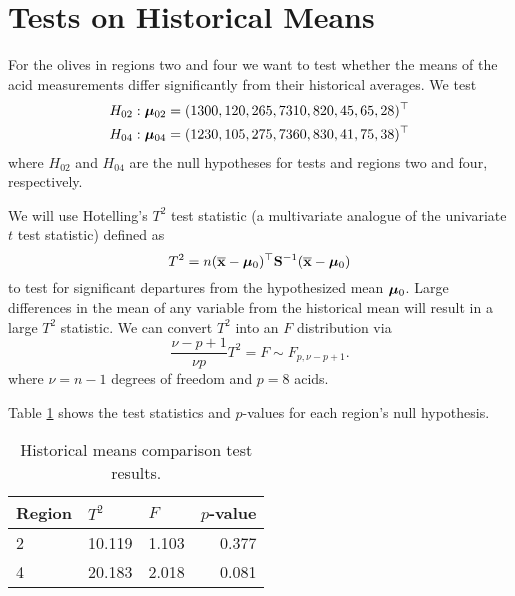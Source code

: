 \section{Tests on Historical Means}

For the olives in regions two and four we want to test whether the means of the acid measurements differ significantly from their historical averages. We test 
\begin{eqnarray*}
H_{02}:\mathbf{\bm{\mu}}_{02}=(1300,120,265,7310,820,45,65,28)^\top \\
H_{04}:\mathbf{\bm{\mu}}_{04}=(1230,105,275,7360,830,41,75,38)^\top
\end{eqnarray*}
where $H_{02}$ and $H_{04}$ are the null hypotheses for tests and regions two and four, respectively.

We will use Hotelling's $T^2$ test statistic (a multivariate analogue of the univariate $t$ test statistic) defined as
\[ T^2 = n(\overline{\mathbf{\bm{x}}}-\mathbf{\bm{\mu}}_0)^\top\mathbf{\bm{S}}^{-1}(\overline{\mathbf{\bm{x}}}-\mathbf{\bm{\mu}}_0) \]
to test for significant departures from the hypothesized mean $\mathbf{\bm{\mu}}_0$. Large differences in the mean of any variable from the historical mean will result in a large $T^2$ statistic. We can convert $T^2$ into an $F$ distribution via
\[ \frac{\nu -p+1}{\nu p}T^2 = F \sim F_{p,\nu-p+1}. \]
where $\nu=n-1$ degrees of freedom and $p=8$ acids.

Table \ref{history} shows the test statistics and $p$-values for each region's null hypothesis.
\begin{table}[H]
\begin{center}
\begin{tabular}{l | rrr}
Region & \multicolumn{1}{l}{$T^2$}  & \multicolumn{1}{l}{$F$}    & \multicolumn{1}{l}{$p$-value} \\ \hline \hline
     2 & 10.119 & 1.103  & 0.377     \\
     4 & 20.183 & 2.018  & 0.081     \\
\end{tabular}
\caption{Historical means comparison test results.}
\label{history}
\end{center}
\end{table}

